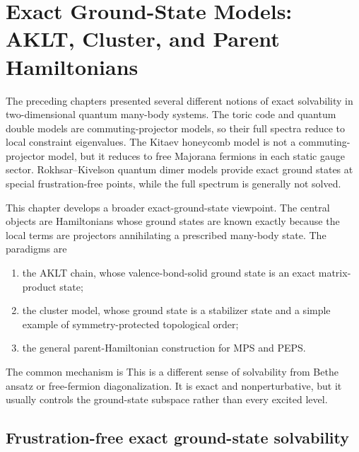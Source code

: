 \chapter[Exact Ground-State Models]{Exact Ground-State Models: AKLT, Cluster, and Parent Hamiltonians}
\label{chap:exact-ground-state-models}

The preceding chapters presented several different notions of exact solvability
in two-dimensional quantum many-body systems.  The toric code and quantum double
models are commuting-projector models, so their full spectra reduce to local
constraint eigenvalues.  The Kitaev honeycomb model is not a commuting-projector
model, but it reduces to free Majorana fermions in each static gauge sector.
Rokhsar--Kivelson quantum dimer models provide exact ground states at special
frustration-free points, while the full spectrum is generally not solved.

This chapter develops a broader exact-ground-state viewpoint.  The central
objects are Hamiltonians whose ground states are known exactly because the local
terms are projectors annihilating a prescribed many-body state.  The paradigms
are
\begin{enumerate}[label=(\roman*)]
    \item the AKLT chain, whose valence-bond-solid ground state is an exact
    matrix-product state;
    \item the cluster model, whose ground state is a stabilizer state and a
    simple example of symmetry-protected topological order;
    \item the general parent-Hamiltonian construction for MPS and PEPS.
\end{enumerate}
The common mechanism is
This is a different sense of solvability from Bethe ansatz or free-fermion
diagonalization.  It is exact and nonperturbative, but it usually controls the
ground-state subspace rather than every excited level.

\section{Frustration-free exact ground-state solvability}
\label{sec:frustration-free-ground-state-solvability}

